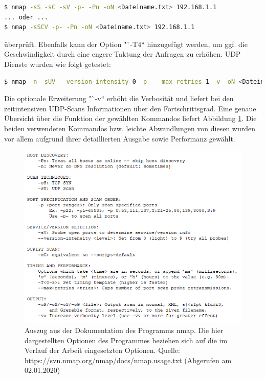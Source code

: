\documentclass[a4paper]{book}
\begin{document}
\begin{large}
\begin{onehalfspace}
\begin{lstlisting}[language=sh,caption={Verwendetes nmap-Kommando zum Scannen aller \textbf{TCP}-Ports des OpenWrt Routers.}]
$ nmap -sS -sC -sV -p- -Pn -oN <Dateiname.txt> 192.168.1.1
... oder ... 
$ nmap -sSCV -p- -Pn -oN <Dateiname.txt> 192.168.1.1
\end{lstlisting}

\noindent überprüft. Ebenfalls kann der Option "`-T4“ hinzugefügt werden, um ggf. die Geschwindigkeit durch eine engere Taktung der Anfragen zu erhöhen. UDP Dienste wurden wie folgt getestet: \\

\begin{lstlisting}[language=sh,caption={Verwendetes nmap-Kommando zum Scannen aller \textbf{UDP}-Ports des OpenWrt Routers.}]
$ nmap -n -sUV --version-intensity 0 -p- --max-retries 1 -v -oN <Dateiname.txt> 192.168.1.1
\end{lstlisting}

\noindent Die optionale Erweiterung "`-v“ erhöht die Verbosität und liefert bei den zeitintensiven UDP-Scans Informationen über den Fortschrittsgrad. Eine genaue Übersicht über die Funktion der gewählten Kommandos liefert Abbildung \ref{fig:nmap Dokumentation}. Die beiden verwendeten Kommandos bzw. leichte Abwandlungen von diesen wurden vor allem aufgrund ihrer detaillierten Ausgabe sowie Performanz gewählt. \pagebreak


\begin{figure}[h]
\begin{center}
\includegraphics[scale=0.65]{images/nmap_Dokumentation} 
\caption{Auszug aus der Dokumentation des Programms nmap. Die hier dargestellten Optionen des Programmes beziehen sich auf die im Verlauf der Arbeit eingesetzten Optionen. Quelle: https://svn.nmap.org/nmap/docs/nmap.usage.txt (Abgerufen am 02.01.2020)}
\label{fig:nmap Dokumentation}
\end{center}
\end{figure}


\end{onehalfspace}
\end{large}
\end{document}
